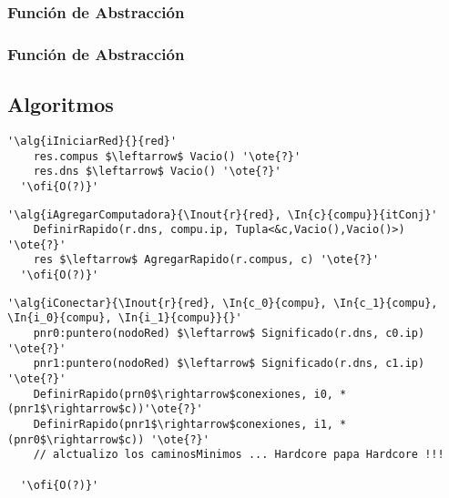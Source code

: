   \subsubsection{Función de Abstracción}

\subsubsection{Función de Abstracción}




\subsection{Algoritmos}
\lstset{style=alg}
\begin{lstlisting}[mathescape]
  '\alg{iIniciarRed}{}{red}'
    res.compus $\leftarrow$ Vacio() '\ote{?}'
    res.dns $\leftarrow$ Vacio() '\ote{?}'
  '\ofi{O(?)}'
\end{lstlisting}

\begin{lstlisting}[mathescape]
  '\alg{iAgregarComputadora}{\Inout{r}{red}, \In{c}{compu}}{itConj}'
    DefinirRapido(r.dns, compu.ip, Tupla<&c,Vacio(),Vacio()>) '\ote{?}'
    res $\leftarrow$ AgregarRapido(r.compus, c) '\ote{?}'
  '\ofi{O(?)}'
\end{lstlisting}

\begin{lstlisting}[mathescape]
  '\alg{iConectar}{\Inout{r}{red}, \In{c_0}{compu}, \In{c_1}{compu}, \In{i_0}{compu}, \In{i_1}{compu}}{}'
    pnr0:puntero(nodoRed) $\leftarrow$ Significado(r.dns, c0.ip) '\ote{?}'
    pnr1:puntero(nodoRed) $\leftarrow$ Significado(r.dns, c1.ip) '\ote{?}'
    DefinirRapido(prn0$\rightarrow$conexiones, i0, *(pnr1$\rightarrow$c))'\ote{?}'
    DefinirRapido(pnr1$\rightarrow$conexiones, i1, *(pnr0$\rightarrow$c)) '\ote{?}'
    // alctualizo los caminosMinimos ... Hardcore papa Hardcore !!! 

  '\ofi{O(?)}'
\end{lstlisting}

